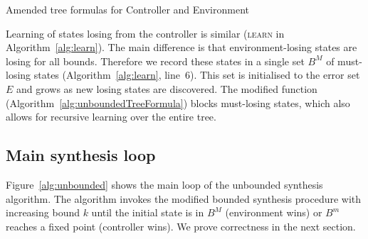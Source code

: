 \begin{algorithm}[t] \caption{Amended tree formulas for Controller and
    Environment} \label{alg:unboundedTreeFormula} \begin{algorithmic}[1]
          \State
         \Else \State {} \EndIf
        \EndFunction {} \end{algorithmic}

    \begin{algorithmic}[1]
        \State {}
        \Else
        \State {}
        \EndIf
        \EndFunction
    \end{algorithmic}
\end{algorithm}

Learning of states losing from the controller is similar (\textsc{learn} in
Algorithm~\ref{alg:learn}). The main difference is that environment-losing
states are losing for all bounds. Therefore we record these states in a single
set $B^M$ of must-losing states (Algorithm~\ref{alg:learn}, line~6).  This set
is initialised to the error set $E$ and grows as new losing states are
discovered.  The modified \textsc{} function
(Algorithm~\ref{alg:unboundedTreeFormula}) blocks must-losing states, which
also allows for recursive learning over the entire tree.

\subsection{Main synthesis loop}

Figure~\ref{alg:unbounded} shows the main loop of the unbounded synthesis algorithm.
The algorithm invokes the modified bounded synthesis procedure with increasing bound $k$
until the initial state is in $B^M$ (environment wins) or $B^m$ reaches a fixed point 
(controller wins). We prove correctness in the next section.

